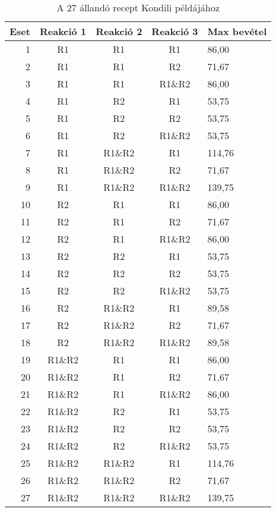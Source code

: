 \begin{table}[H]
	\begin{center}
		\caption{A 27 állandó recept Kondili példájához}
		\captionsetup[table]{skip=10pt}
		\label{tabla1}
		\begin{tabular}{r|ccc|l}
		Eset & Reakció 1 & Reakció 2 & Reakció 3 & Max bevétel  \\ 
		\hline
		1    & R1        & R1        & R1        & 86,00        \\
		2    & R1        & R1        & R2        & 71,67        \\
		3    & R1        & R1        & R1\&R2    & 86,00        \\
		4    & R1        & R2        & R1        & 53,75        \\
		5    & R1        & R2        & R2        & 53,75        \\
		6    & R1        & R2        & R1\&R2    & 53,75        \\
		7    & R1        & R1\&R2    & R1        & 114,76       \\
		8    & R1        & R1\&R2    & R2        & 71,67        \\
		9    & R1        & R1\&R2    & R1\&R2    & 139,75       \\
		10   & R2        & R1        & R1        & 86,00        \\
		11   & R2        & R1        & R2        & 71,67        \\
		12   & R2        & R1        & R1\&R2    & 86,00        \\
		13   & R2        & R2        & R1        & 53,75        \\
		14   & R2        & R2        & R2        & 53,75        \\
		15   & R2        & R2        & R1\&R2    & 53,75        \\
		16   & R2        & R1\&R2    & R1        & 89,58        \\
		17   & R2        & R1\&R2    & R2        & 71,67        \\
		18   & R2        & R1\&R2    & R1\&R2    & 89,58        \\
		19   & R1\&R2    & R1        & R1        & 86,00        \\
		20   & R1\&R2    & R1        & R2        & 71,67        \\
		21   & R1\&R2    & R1        & R1\&R2    & 86,00        \\
		22   & R1\&R2    & R2        & R1        & 53,75        \\
		23   & R1\&R2    & R2        & R2        & 53,75        \\
		24   & R1\&R2    & R2        & R1\&R2    & 53,75        \\
		25   & R1\&R2    & R1\&R2    & R1        & 114,76       \\
		26   & R1\&R2    & R1\&R2    & R2        & 71,67        \\
		27   & R1\&R2    & R1\&R2    & R1\&R2    & 139,75      
		\end{tabular}
	\end{center}
\end{table}

